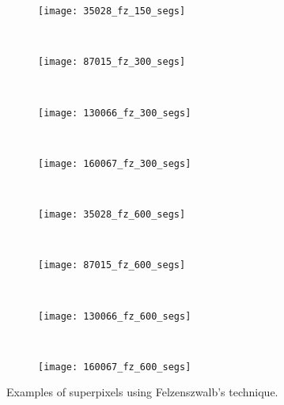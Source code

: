 \begin{figure}[!ht]
    \begin{subfigure}[t]{\textwidth+20pt\relax}
    	\texttt{[image: 35028\_fz\_150\_segs]} 
    \end{subfigure}      
    ~ %
    \begin{subfigure}[b]{0.2\textwidth}
        \texttt{[image: 87015\_fz\_300\_segs]}
    \end{subfigure}
    ~ %
    \begin{subfigure}[b]{0.2\textwidth}
        \texttt{[image: 130066\_fz\_300\_segs]}
    \end{subfigure}
    ~ %
    \begin{subfigure}[b]{0.2\textwidth}
        \texttt{[image: 160067\_fz\_300\_segs]}
    \end{subfigure} \\ [2ex]
    
    \begin{subfigure}[t]{\textwidth+20pt\relax}
    	\texttt{[image: 35028\_fz\_600\_segs]} 
    \end{subfigure}      
    ~ %
    \begin{subfigure}[b]{0.2\textwidth}
        \texttt{[image: 87015\_fz\_600\_segs]}
    \end{subfigure}
    ~ %
    \begin{subfigure}[b]{0.2\textwidth}
        \texttt{[image: 130066\_fz\_600\_segs]}
    \end{subfigure}
    ~ %
    \begin{subfigure}[b]{0.2\textwidth}
        \texttt{[image: 160067\_fz\_600\_segs]}
    \end{subfigure}     

	\caption{Examples of superpixels using Felzenszwalb's technique.}\label{fig:fz_suprepixels}    
\end{figure}

